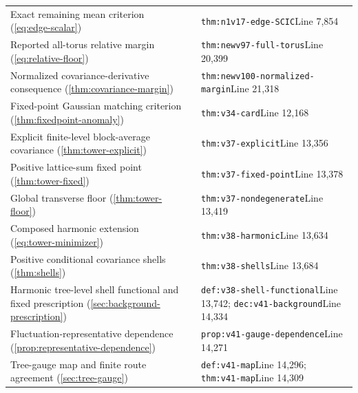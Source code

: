 \documentclass[11pt,oneside,openany]{book}
\theoremstyle{definition}
\theoremstyle{remark}
\begin{document}
\begin{longtable}{L{0.32\textwidth}L{0.12\textwidth}L{0.477\textwidth}}
Exact remaining mean criterion (\cref{eq:edge-scalar}) & \cite{F9} & \nolinkurl{thm:n1v17-edge-SCIC}\newline Line 7,854 \\
Reported all-torus relative margin (\cref{eq:relative-floor}) & \cite{F10} & \nolinkurl{thm:newv97-full-torus}\newline Line 20,399 \\
Normalized covariance-derivative consequence (\cref{thm:covariance-margin}) & \cite{F10} & \nolinkurl{thm:newv100-normalized-margin}\newline Line 21,318 \\
Fixed-point Gaussian matching criterion (\cref{thm:fixedpoint-anomaly}) & \cite{F11} & \nolinkurl{thm:v34-card}\newline Line 12,168 \\
Explicit finite-level block-average covariance (\cref{thm:tower-explicit}) & \cite{F11} & \nolinkurl{thm:v37-explicit}\newline Line 13,356 \\
Positive lattice-sum fixed point (\cref{thm:tower-fixed}) & \cite{F11} & \nolinkurl{thm:v37-fixed-point}\newline Line 13,378 \\
Global transverse floor (\cref{thm:tower-floor}) & \cite{F11} & \nolinkurl{thm:v37-nondegenerate}\newline Line 13,419 \\
Composed harmonic extension (\cref{eq:tower-minimizer}) & \cite{F11} & \nolinkurl{thm:v38-harmonic}\newline Line 13,634 \\
Positive conditional covariance shells (\cref{thm:shells}) & \cite{F11} & \nolinkurl{thm:v38-shells}\newline Line 13,684 \\
Harmonic tree-level shell functional and fixed prescription (\cref{sec:background-prescription}) & \cite{F11} & \nolinkurl{def:v38-shell-functional}\newline Line 13,742; \nolinkurl{dec:v41-background}\newline Line 14,334 \\
Fluctuation-representative dependence (\cref{prop:representative-dependence}) & \cite{F11} & \nolinkurl{prop:v41-gauge-dependence}\newline Line 14,271 \\
Tree-gauge map and finite route agreement (\cref{sec:tree-gauge}) & \cite{F11} & \nolinkurl{def:v41-map}\newline Line 14,296; \nolinkurl{thm:v41-map}\newline Line 14,309 \\

\end{longtable}
\end{document}
